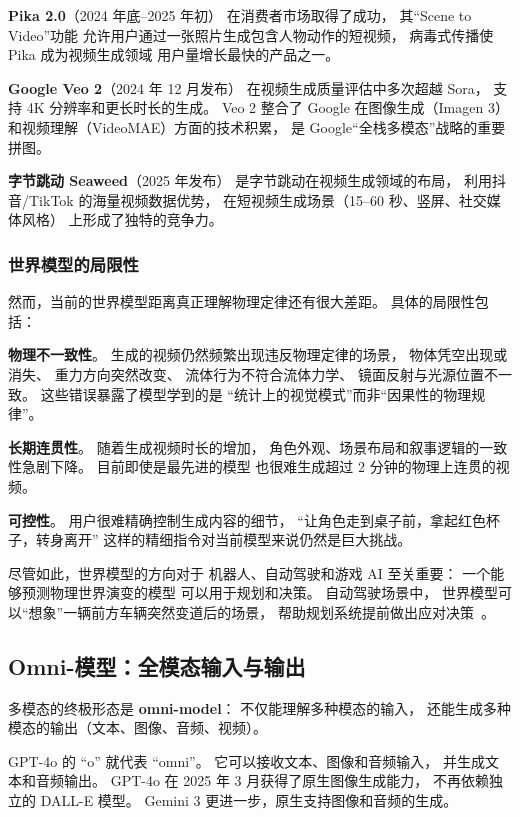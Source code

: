 \textbf{Pika 2.0}（2024 年底--2025 年初）
在消费者市场取得了成功，
其“Scene to Video”功能
允许用户通过一张照片生成包含人物动作的短视频，
病毒式传播使 Pika 成为视频生成领域
用户量增长最快的产品之一。

\textbf{Google Veo 2}（2024 年 12 月发布）
在视频生成质量评估中多次超越 Sora，
支持 4K 分辨率和更长时长的生成。
Veo 2 整合了 Google 在图像生成（Imagen 3）
和视频理解（VideoMAE）方面的技术积累，
是 Google“全栈多模态”战略的重要拼图。

\textbf{字节跳动 Seaweed}（2025 年发布）
是字节跳动在视频生成领域的布局，
利用抖音/TikTok 的海量视频数据优势，
在短视频生成场景（15--60 秒、竖屏、社交媒体风格）
上形成了独特的竞争力。

\subsubsection{世界模型的局限性}

然而，当前的世界模型距离真正理解物理定律还有很大差距。
具体的局限性包括：

\textbf{物理不一致性}。
生成的视频仍然频繁出现违反物理定律的场景，
物体凭空出现或消失、
重力方向突然改变、
流体行为不符合流体力学、
镜面反射与光源位置不一致。
这些错误暴露了模型学到的是
“统计上的视觉模式”而非“因果性的物理规律”。

\textbf{长期连贯性}。
随着生成视频时长的增加，
角色外观、场景布局和叙事逻辑的一致性急剧下降。
目前即使是最先进的模型
也很难生成超过 2 分钟的物理上连贯的视频。

\textbf{可控性}。
用户很难精确控制生成内容的细节，
“让角色走到桌子前，拿起红色杯子，转身离开”
这样的精细指令对当前模型来说仍然是巨大挑战。

尽管如此，世界模型的方向对于
机器人、自动驾驶和游戏 AI 至关重要：
一个能够预测物理世界演变的模型
可以用于规划和决策。
自动驾驶场景中，
世界模型可以“想象”一辆前方车辆突然变道后的场景，
帮助规划系统提前做出应对决策~\cite{hu2023gaia1}。

\subsection{Omni-模型：全模态输入与输出}

多模态的终极形态是 \textbf{omni-model}：
不仅能理解多种模态的输入，
还能生成多种模态的输出（文本、图像、音频、视频）。

GPT-4o 的 “o” 就代表 “omni”。
它可以接收文本、图像和音频输入，
并生成文本和音频输出。
GPT-4o 在 2025 年 3 月获得了原生图像生成能力，
不再依赖独立的 DALL-E 模型。
Gemini 3 更进一步，原生支持图像和音频的生成。

